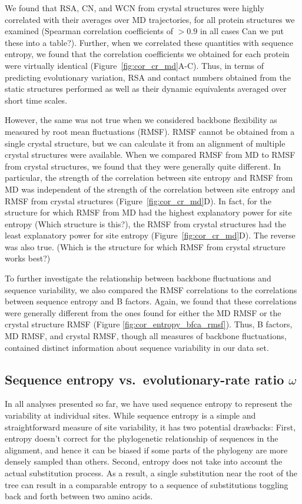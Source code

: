\documentclass[12pt]{article}
\begin{document}
We found that RSA, CN, and WCN from crystal structures were highly correlated with their averages over MD trajectories, for all protein structures we examined (Spearman correlation coefficients of $>0.9$ in all cases {\color{red}Can we put these into a table?}). Further, when we correlated these quantities with sequence entropy, we found that the correlation coefficients we obtained for each protein were virtually identical (Figure~\ref{fig:cor_cr_md}A-C). Thus, in terms of predicting evolutionary variation, RSA and contact numbers obtained from the static structures performed as well as their dynamic equivalents averaged over short time scales.

However, the same was not true when we considered backbone flexibility as measured by root mean fluctuations (RMSF). RMSF cannot be obtained from a single crystal structure, but we can calculate it from an alignment of multiple crystal structures were available. When we compared RMSF from MD to RMSF from crystal structures, we found that they were generally quite different. In particular, the strength of the correlation between site entropy and RMSF from MD was independent of the strength of the correlation between site entropy and RMSF from crystal structures (Figure~\ref{fig:cor_cr_md}D). In fact, for the structure for which RMSF from MD had the highest explanatory power for site entropy {\color{red}(Which structure is this?)}, the RMSF from crystal structures had the least explanatory power for site entropy (Figure~\ref{fig:cor_cr_md}D). The reverse was also true. {\color{red}(Which is the structure for which RMSF from crystal structure works best?)}

To further investigate the relationship between backbone fluctuations and sequence variability, we also compared the RMSF correlations to the correlations between sequence entropy and B factors. Again, we found that these correlations were generally different from the ones found for either the MD RMSF or the crystal structure RMSF (Figure \ref{fig:cor_entropy_bfca_rmsf}). Thus, B factors, MD RMSF, and crystal RMSF, though all measures of backbone fluctuations, contained distinct information about sequence variability in our data set.

\subsection*{Sequence entropy vs.\ evolutionary-rate ratio $\omega$}

In all analyses presented so far, we have used sequence entropy to represent the variability at individual sites. While sequence entropy is a simple and straightforward measure of site variability, it has two potential drawbacks: First, entropy doesn't correct for the phylogenetic relationship of sequences in the alignment, and hence it can be biased if some parts of the phylogeny are more densely sampled than others. Second, entropy does not take into account the actual substitution process. As a result, a single substitution near the root of the tree can result in a comparable entropy to a sequence of substitutions toggling back and forth between two amino acids.
\end{document}
